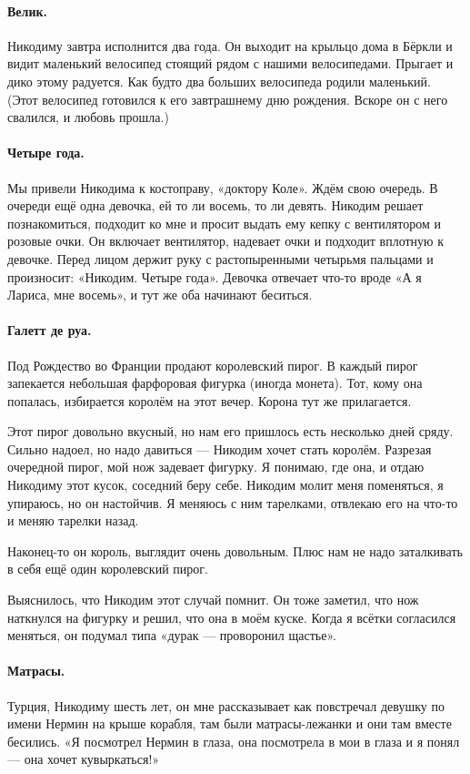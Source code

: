 \documentclass{book}
\begin{document}
\paragraph{Велик.}
Никодиму завтра исполнится два года.
Он выходит на крыльцо дома в Бёркли и видит маленький велосипед стоящий рядом с нашими велосипедами. Прыгает и дико этому радуется.
Как будто два больших велосипеда родили маленький.
(Этот велосипед готовился к его завтрашнему дню рождения. Вскоре он с него свалился, и любовь прошла.)

\paragraph{Четыре года.}
Мы привели Никодима к костоправу, «доктору Коле».
Ждём свою очередь.
В очереди ещё одна девочка, ей то ли восемь, то ли девять.
Никодим решает познакомиться, подходит ко мне и просит выдать ему кепку с вентилятором и розовые очки.
Он включает вентилятор, надевает очки и подходит вплотную к девочке.
Перед лицом держит руку с растопыренными четырьмя пальцами и произносит:
«Никодим. Четыре года».
Девочка отвечает что-то вроде «А я Лариса, мне восемь», и тут же оба начинают беситься.

\paragraph{Галетт де руа.}
Под Рождество во Франции продают королевский пирог.
В каждый пирог запекается небольшая фарфоровая фигурка (иногда монета).
Тот, кому она попалась, избирается королём на этот вечер.
Корона тут же прилагается.

Этот пирог довольно вкусный, но нам его пришлось есть несколько дней сряду.
Сильно надоел, но надо давиться --- Никодим хочет стать королём.
Разрезая очередной пирог, мой нож задевает фигурку.
Я понимаю, где она, и отдаю Никодиму этот кусок,
соседний беру себе.
Никодим молит меня поменяться, я упираюсь, но он настойчив.
Я меняюсь с ним тарелками, отвлекаю его на что-то и меняю тарелки назад.

Наконец-то он король, выглядит очень довольным.
Плюс нам не надо заталкивать в себя ещё один королевский пирог.

Выяснилось, что Никодим этот случай помнит.
Он тоже заметил, что нож наткнулся на фигурку и решил, что она в моём куске.
Когда я всётки согласился меняться, он подумал типа «дурак --- проворонил щастье».

\paragraph{Матрасы.}
Турция, Никодиму шесть лет, он мне рассказывает как повстречал девушку по имени Нермин на крыше корабля,
там были матрасы-лежанки и они там вместе бесились.
«Я посмотрел Нермин в глаза, она посмотрела в мои в глаза и я понял --- она хочет кувыркаться!»
\end{document}
